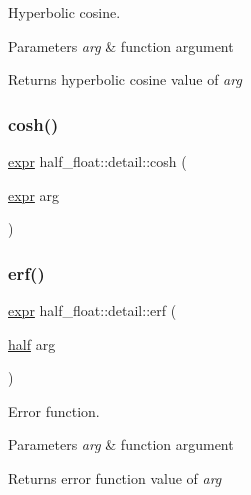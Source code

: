 Hyperbolic cosine. 
\begin{DoxyParams}{Parameters}
{\em arg} & function argument \\
\hline
\end{DoxyParams}
\begin{DoxyReturn}{Returns}
hyperbolic cosine value of {\itshape arg} 
\end{DoxyReturn}
\mbox{\label{namespacehalf__float_1_1detail_a70e455e2c9707767d81bee70b7cb2118}} 
\subsubsection{\texorpdfstring{cosh()}{cosh()}\hspace{0.1cm}{\footnotesize\ttfamily [2/2]}}
{\footnotesize\ttfamily \hyperlink{structhalf__float_1_1detail_1_1expr}{expr} half\+\_\+float\+::detail\+::cosh (\begin{DoxyParamCaption}\item[{\hyperlink{structhalf__float_1_1detail_1_1expr}{expr}}]{arg }\end{DoxyParamCaption})\hspace{0.3cm}{\ttfamily [inline]}}

\mbox{\label{namespacehalf__float_1_1detail_a91bfb5ecc731b688a5a866d1da4c6699}} 
\subsubsection{\texorpdfstring{erf()}{erf()}\hspace{0.1cm}{\footnotesize\ttfamily [1/2]}}
{\footnotesize\ttfamily \hyperlink{structhalf__float_1_1detail_1_1expr}{expr} half\+\_\+float\+::detail\+::erf (\begin{DoxyParamCaption}\item[{\hyperlink{classhalf__float_1_1half}{half}}]{arg }\end{DoxyParamCaption})\hspace{0.3cm}{\ttfamily [inline]}}

Error function. 
\begin{DoxyParams}{Parameters}
{\em arg} & function argument \\
\hline
\end{DoxyParams}
\begin{DoxyReturn}{Returns}
error function value of {\itshape arg} 
\end{DoxyReturn}
\mbox{\label{namespacehalf__float_1_1detail_ab4dcbfac787425f31d61309cecdded5d}} 
